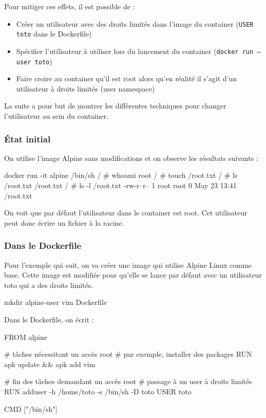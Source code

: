 \documentclass[11pt,a4paper,oneside]{report}
\newcommand{\code}[1]{\texttt{#1}}
\begin{document}
Pour mitiger ces effets, il est possible de :
\begin{itemize}
\item Créer un utilisateur avec des droits limités dans l'image du container (\code{USER toto} dans le Dockerfile)
\item Spécifier l'utilisateur à utiliser lors du lancement du container (\code{docker run --user toto})
\item Faire croire au container qu'il est root alors qu'en réalité il s'agit d'un utilisateur à droits limités (user namespace)
\end{itemize}

La suite a pour but de montrer les différentes techniques pour changer l'utilisateur au sein du container.

\subsubsection{État initial}
On utilise l'image Alpine sans modifications et on observe les résultats suivants :

\begin{textcode}
docker run -it alpine /bin/sh
/ # whoami
root
/ # touch /root.txt
/ # ls /root.txt
/root.txt
/ # ls -l /root.txt
-rw-r--r--    1 root     root             0 May 23 13:41 /root.txt
\end{textcode}

On voit que par défaut l'utilisateur dans le container est root. Cet utilisateur peut donc écrire un fichier à la racine.

\subsubsection{Dans le Dockerfile}
Pour l'exemple qui suit, on va créer une image qui utilise Alpine Linux comme base. Cette image est modifiée pour qu'elle se lance par défaut avec un utilisateur toto qui a des droits limités.

\begin{bashcode}
mkdir alpine-user
vim Dockerfile
\end{bashcode}

Dans le Dockerfile, on écrit :
\begin{bashcode}
FROM alpine

# tâches nécessitant un accès root
# par exemple, installer des packages
RUN apk update && apk add vim

# fin des tâches demandant un accès root
# passage à un user à droits limités
RUN adduser -h /home/toto -s /bin/sh -D toto
USER toto

CMD ["/bin/sh"]
\end{bashcode}
\end{document}
